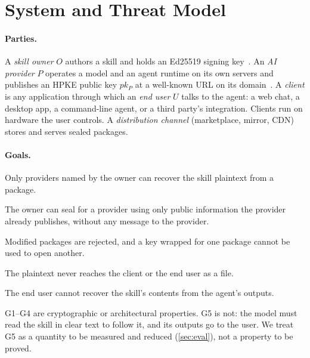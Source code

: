 \section{System and Threat Model}
\label{sec:threat}

\paragraph{Parties.}
A \emph{skill owner} $O$ authors a skill and holds an Ed25519 signing key~\citep{rfc8032}. An
\emph{AI provider} $P$ operates a model and an agent runtime on its own servers and publishes an
HPKE public key $pk_P$ at a well-known URL on its domain~\citep{rfc8615}. A \emph{client} is any
application through which an \emph{end user} $U$ talks to the agent: a web chat, a desktop app, a
command-line agent, or a third party's integration. Clients run on hardware the user controls. A
\emph{distribution channel} (marketplace, mirror, CDN) stores and serves sealed packages.

\paragraph{Goals.}
\begin{description}[leftmargin=1.2em]
  \item[G1 Recipient confidentiality.] Only providers named by the owner can recover the skill
  plaintext from a package.
  \item[G2 No handshake.] The owner can seal for a provider using only public information the
  provider already publishes, without any message to the provider.
  \item[G3 Integrity and binding.] Modified packages are rejected, and a key wrapped for one package
  cannot be used to open another.
  \item[G4 Client exclusion.] The plaintext never reaches the client or the end user as a file.
  \item[G5 Output confidentiality.] The end user cannot recover the skill's contents from the
  agent's outputs.
\end{description}
G1--G4 are cryptographic or architectural properties. G5 is not: the model must read the skill in
clear text to follow it, and its outputs go to the user. We treat G5 as a quantity to be measured
and reduced (\cref{sec:eval}), not a property to be proved.

